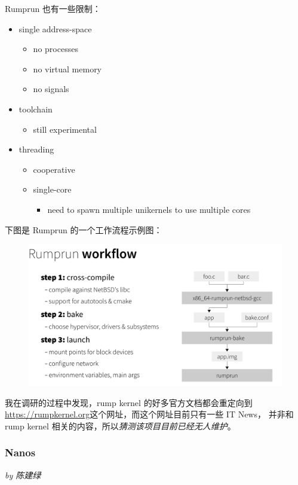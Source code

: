 \documentclass[UTF8,fontset=none,linespread=1.15]{ctexart}
\newcommand{\sectionauthor}[1]{%
\vspace*{-5ex}
\noindent\textrm{\hfill\textit{by #1}}
\vspace*{2ex}\par}
\begin{document}
Rumprun 也有一些限制：

\begin{itemize}
\item single address-space
    \begin{itemize}
    \item no processes
    \item no virtual memory
    \item no signals
    \end{itemize}
\item toolchain
    \begin{itemize}
    \item still experimental
    \end{itemize}
\item threading
    \begin{itemize}
    \item cooperative
    \item single-core
        \begin{itemize}
        \item need to spawn multiple unikernels to use multiple cores
        \end{itemize}
    \end{itemize}
\end{itemize}

下图是 Rumprun 的一个工作流程示例图：
\begin{figure}[H]
\includegraphics[width=\linewidth]{pictures/rumprun-3.png}
\caption{}
\end{figure}

我在调研的过程中发现，rump kernel 的好多官方文档都会重定向到
\url{https://rumpkernel.org}这个网址，而这个网址目前只有一些 IT News，
并非和 rump kernel 相关的内容，所以\textit{猜测该项目目前已经无人维护}。

\subsubsection{Nanos}\sectionauthor{陈建绿}
\end{document}
